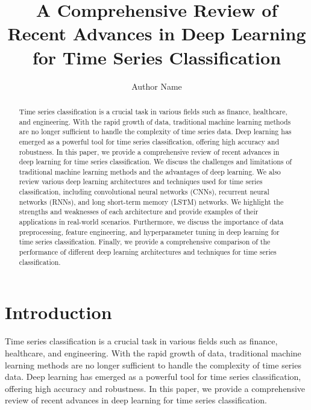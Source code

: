 \documentclass{article}
\begin{document}
\title{A Comprehensive Review of Recent Advances in Deep Learning for Time Series Classification}

\author{Author Name}

\maketitle

\begin{abstract}
Time series classification is a crucial task in various fields such as finance, healthcare, and engineering. With the rapid growth of data, traditional machine learning methods are no longer sufficient to handle the complexity of time series data. Deep learning has emerged as a powerful tool for time series classification, offering high accuracy and robustness. In this paper, we provide a comprehensive review of recent advances in deep learning for time series classification. We discuss the challenges and limitations of traditional machine learning methods and the advantages of deep learning. We also review various deep learning architectures and techniques used for time series classification, including convolutional neural networks (CNNs), recurrent neural networks (RNNs), and long short-term memory (LSTM) networks. We highlight the strengths and weaknesses of each architecture and provide examples of their applications in real-world scenarios. Furthermore, we discuss the importance of data preprocessing, feature engineering, and hyperparameter tuning in deep learning for time series classification. Finally, we provide a comprehensive comparison of the performance of different deep learning architectures and techniques for time series classification.

\end{abstract}

\section{Introduction}

Time series classification is a crucial task in various fields such as finance, healthcare, and engineering. With the rapid growth of data, traditional machine learning methods are no longer sufficient to handle the complexity of time series data. Deep learning has emerged as a powerful tool for time series classification, offering high accuracy and robustness. In this paper, we provide a comprehensive review of recent advances in deep learning for time series classification.
\end{document}
